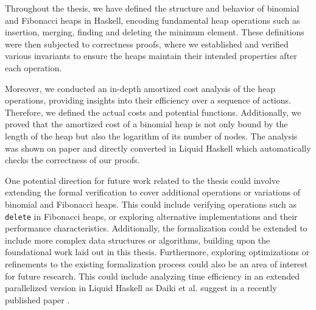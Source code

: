 \documentclass{clmthesis}
\begin{document}
Throughout the thesis, we have defined the structure and behavior of binomial and Fibonacci heaps in Haskell, encoding fundamental heap operations such as insertion, merging, finding and deleting the minimum element. These definitions were then subjected to correctness proofs, where we established and verified various invariants to ensure the heaps maintain their intended properties after each operation.

Moreover, we conducted an in-depth amortized cost analysis of the heap operations, providing insights into their efficiency over a sequence of actions. Therefore, we defined the actual costs and potential functions. Additionally, we proved that the amortized cost of a binomial heap is not only bound by the length of the heap but also the logarithm of its number of nodes. The analysis was shown on paper and directly converted in Liquid Haskell which automatically checks the correctness of our proofs.

One potential direction for future work related to the thesis could involve extending the formal verification to cover additional operations or variations of binomial and Fibonacci heaps. This could include verifying operations such as \texttt{delete} in Fibonacci heaps, or exploring alternative implementations and their performance characteristics. Additionally, the formalization could be extended to include more complex data structures or algorithms, building upon the foundational work laid out in this thesis. Furthermore, exploring optimizations or refinements to the existing formalization process could also be an area of interest for future research. This could include analyzing time efficiency in an extended parallelized version in Liquid Haskell as Daiki et al. suggest in a recently published paper \cite{daiki2024time}.

%
%
\appendix


\end{document}
